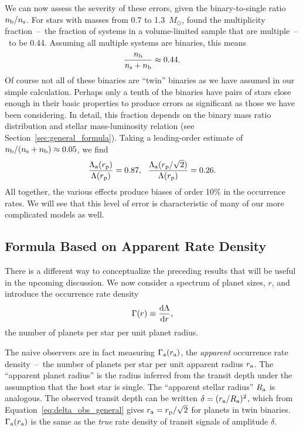 \documentclass[12pt,modern]{aastex61}
\renewcommand{\a}{_{\rm a}}
\newcommand{\s}{_{\rm s}}
\newcommand{\p}{_{\rm p}}
\renewcommand{\b}{_{\rm b}}
\begin{document}
We can now assess the severity of these errors, given the
binary-to-single ratio $n\b/n\s$. For stars with masses from 0.7 to
1.3~$M_\odot$, \citet{raghavan_survey_2010} found the multiplicity
fraction~--~the fraction of systems in a volume-limited sample that
are multiple~--~to be 0.44.  Assuming all multiple systems are
binaries, this means
\begin{equation}
    \frac{n\b}{n\s + n\b} \approx 0.44.
\end{equation}
Of course not all of these binaries are ``twin'' binaries as we have
assumed in our simple calculation. Perhaps only a tenth of the
binaries have pairs of stars close enough in their basic properties to
produce errors as significant as those we have been considering. In
detail, this fraction depends on the binary mass ratio distribution
and stellar mass-luminosity relation (see
Section~\ref{sec:general_formula}).  Taking a leading-order estimate
of $n\b/(n\s+n\b)\approx0.05$, we find
\begin{equation}
    \frac{\Lambda\a(r\p)}{\Lambda(r\p)} = 0.87,~~
    \frac{\Lambda\a(r\p/\sqrt{2})}{\Lambda(r\p)} = 0.26.
    \label{eq:ratios}
\end{equation}
All together, the various effects produce biases of order 10\% in the
occurrence rates.  We will see that this level of error is
characteristic of many of our more complicated models as well.


\subsection{Formula Based on Apparent Rate Density}
\label{sec:model_1_density}

There is a different way to conceptualize the preceding results that
will be useful in the upcoming discussion. We now consider a spectrum
of planet sizes, $r$, and introduce the occurrence rate density
\begin{equation}
    \Gamma(r) \equiv \frac{{\rm d}\Lambda}{{\rm d}r},
    \label{eq:rate_density_defn}
\end{equation}
the number of planets per star per unit planet radius.  

The naive observers are in fact measuring $\Gamma\a(r\a)$, the {\it
apparent} occurrence rate density~--~the number of planets per star
per unit apparent radius $r\a$.  The ``apparent planet radius'' is the
radius inferred from the transit depth under the assumption that the
host star is single. The ``apparent stellar radius'' $R\a$ is
analogous.  The observed transit depth can be written $\delta =
(r\a/R\a)^2$, which from Equation~\ref{eq:delta_obs_general} gives
$r\a=r\p/\sqrt{2}$ for planets in twin binaries.  $\Gamma\a(r\a)$ is
the same as the {\it true} rate density of transit signals of
amplitude $\delta$.
\end{document}
